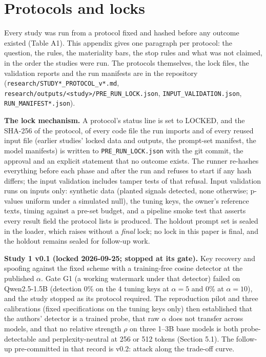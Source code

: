 \documentclass[11pt,letterpaper]{article}
\begin{document}



\appendix

\hypertarget{protocols-and-locks}{%
\section{Protocols and locks}\label{protocols-and-locks}}

Every study was run from a protocol fixed and hashed before any outcome existed (Table A1). This appendix gives one paragraph per protocol: the question, the rules, the materiality bars, the stop rules and what was not claimed, in the order the studies were run. The protocols themselves, the lock files, the validation reports and the run manifests are in the repository (\texttt{research/\allowbreak{}STUDY*\_\allowbreak{}PROTOCOL\_\allowbreak{}v*.\allowbreak{}md}, \texttt{research/\allowbreak{}outputs/\allowbreak{}\textless{}study\textgreater{}/\allowbreak{}PRE\_\allowbreak{}RUN\_\allowbreak{}LOCK.\allowbreak{}json}, \texttt{INPUT\_\allowbreak{}VALIDATION.\allowbreak{}json}, \texttt{RUN\_\allowbreak{}MANIFEST*.\allowbreak{}json}).

\textbf{The lock mechanism.} A protocol's status line is set to LOCKED, and the SHA-256 of the protocol, of every code file the run imports and of every reused input file (earlier studies' locked data and outputs, the prompt-set manifest, the model manifests) is written to \texttt{PRE\_\allowbreak{}RUN\_\allowbreak{}LOCK.\allowbreak{}json} with the git commit, the approval and an explicit statement that no outcome exists. The runner re-hashes everything before each phase and after the run and refuses to start if any hash differs; the input validation includes tamper tests of that refusal. Input validation runs on inputs only: synthetic data (planted signals detected, none otherwise; p-values uniform under a simulated null), the tuning keys, the owner's reference texts, timing against a pre-set budget, and a pipeline smoke test that asserts every result field the protocol lists is produced. The holdout prompt set is sealed in the loader, which raises without a \emph{final} lock; no lock in this paper is final, and the holdout remains sealed for follow-up work.

\textbf{Study 1 v0.1 (locked 2026-09-25; stopped at its gate).} Key recovery and spoofing against the fixed scheme with a training-free cosine detector at the published \(\alpha\). Gate G1 (a working watermark under that detector) failed on Qwen2.5-1.5B (detection 0\% on the 4 tuning keys at \(\alpha = 5\) and 0\% at \(\alpha = 10\)), and the study stopped as its protocol required. The reproduction pilot and three calibrations (fixed specifications on the tuning keys only) then established that the authors' detector is a trained probe, that raw \(\alpha\) does not transfer across models, and that no relative strength \(\rho\) on three 1--3B base models is both probe-detectable and perplexity-neutral at 256 or 512 tokens (Section 5.1). The follow-up pre-committed in that record is v0.2: attack along the trade-off curve.
\end{document}

